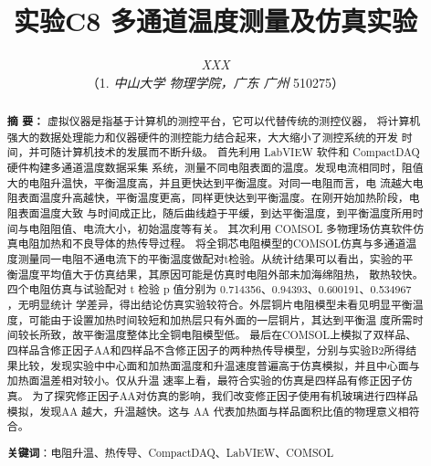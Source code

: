 \documentclass[10pt,a4paper,twoside,UTF8]{ctexart}
\begin{document}
\title{\LARGE\textbf{实验C8 多通道温度测量及仿真实验}\footnotemark[1]}
\author{\large\textit{XXX\footnotemark[2]}
\\ \normalsize{（1. \textit{中山大学 物理学院，广东 广州 }510275）}}
\date{}%


	\maketitle  %
  	\renewcommand{\abstractname} {} %
	\begin{abstract}
	\vspace{-3em}
	{\bf 摘{} 要：}
	{\small 
	虚拟仪器是指基于计算机的测控平台，它可以代替传统的测控仪器，
	将计算机强大的数据处理能力和仪器硬件的测控能力结合起来，大大缩小了测控系统的开发
	时间，并可随计算机技术的发展而不断升级。
	首先利用 LabVIEW 软件和 CompactDAQ 硬件构建多通道温度数据采集
    系统，测量不同电阻表面的温度。发现电流相同时，阻值大的电阻升温快，平衡温度高，并且更快达到平衡温度。对同一电阻而言，电
	流越大电阻表面温度升高越快，平衡温度更高，同样更快达到平衡温度。在刚开始加热阶段，电阻表面温度大致
	与时间成正比，随后曲线趋于平缓，到达平衡温度，到平衡温度所用时间与电阻阻值、电流大小，初始温度等有关。
	其次利用 COMSOL 多物理场仿真软件仿真电阻加热和不良导体的热传导过程。
	将全铜芯电阻模型的COMSOL仿真与多通道温度测量同一电阻不通电流下的平衡温度做配对t检验。从统计结果可以看出，实验的平衡温度平均值大于仿真结果，其原因可能是仿真时电阻外部未加海绵阻热，
	散热较快。四个电阻仿真与试验配对 t 检验 p 值分别为 0.714356、0.94393、0.600191、0.534967 ，无明显统计
	学差异，得出结论仿真实验较符合。外层铜片电阻模型未看见明显平衡温度，可能由于设置加热时间较短和加热层只有外面的一层铜片，其达到平衡温
	度所需时间较长所致，故平衡温度整体比全铜电阻模型低。
	最后在COMSOL上模拟了双样品、四样品含修正因子AA和四样品不含修正因子的两种热传导模型，分别与实验B2所得结果比较，发现实验中中心面和加热面温度和升温速度普遍高于仿真模拟，并且中心面与加热面温差相对较小。仅从升温
	速率上看，最符合实验的仿真是四样品有修正因子仿真。
	为了探究修正因子AA对仿真的影响，我们改变修正因子使用有机玻璃进行四样品模拟，发现AA 越大，升温越快。这与 AA 代表加热面与样品面积比值的物理意义相符合。
	}
	\par%
	\textbf{关键词}：电阻升温、热传导、CompactDAQ、LabVIEW、COMSOL
	\vspace{2em}
	\end{abstract}
\end{document}
